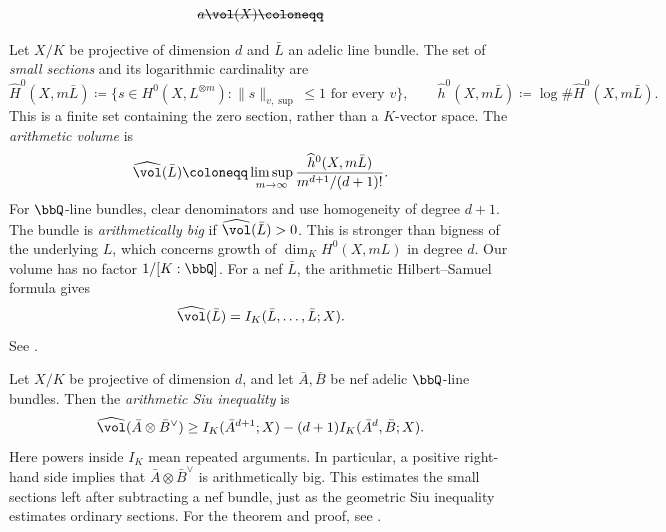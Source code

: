 \begin{definition}[label=\labelNFM{def:arithmetic-volume-of-adelic-line-bundle}, status=draft, tag=0000000]
	\[ \latexdeletedmath{a\vol(X) \coloneqq} \]
	\begin{latexmathchange}
	Let $X/K$ be projective of dimension $d$ and $\bar L$ an adelic line bundle.
	The set of \emph{small sections} and its logarithmic cardinality are
	\[ \widehat H^0(X,m\bar L) \coloneqq \{s \in H^0(X,L^{\otimes m}):\|s\|_{v,\sup} \leq 1\text{ for every }v\}, \qquad \widehat h^0(X,m\bar L) \coloneqq \log\#\widehat H^0(X,m\bar L). \]
	This is a finite set containing the zero section, rather than a $K$-vector space.
	The \emph{arithmetic volume} is
	\[ \widehat{\vol}(\bar L) \coloneqq \limsup_{m \to \infty}\frac{\widehat h^0(X,m\bar L)}{m^{d+1}/(d+1)!}. \]
	For $\bbQ$-line bundles, clear denominators and use homogeneity of degree $d+1$.
	The bundle is \emph{arithmetically big} if $\widehat{\vol}(\bar L) > 0$.
	This is stronger than bigness of the underlying $L$, which concerns growth of $\dim_K H^0(X,mL)$ in degree $d$.
	Our volume has no factor $1/[K:\bbQ]$.
	For a nef $\bar L$, the arithmetic Hilbert--Samuel formula gives
	\[ \widehat{\vol}(\bar L) = I_K(\bar L,\ldots,\bar L;X). \]
	See \cite[\S\S 5.1--5.2, especially Theorem~5.2.2]{Yuan-Zhang-2026-AdelicLineBundles}.
	\end{latexmathchange}
\end{definition}

\begin{theorem}[label=\labelNFM{thm:arithmetic-siu-inequality}, status=draft, tag=0000000]
	\Yang{}
	\begin{latexmathchange}
	Let $X/K$ be projective of dimension $d$, and let $\bar A,\bar B$ be nef adelic $\bbQ$-line bundles.
	Then the \emph{arithmetic Siu inequality} is
	\[ \widehat{\vol}(\bar A\otimes\bar B^\vee) \geq I_K(\bar A^{d+1};X)-(d+1)I_K(\bar A^d,\bar B;X). \]
	Here powers inside $I_K$ mean repeated arguments.
	In particular, a positive right-hand side implies that $\bar A\otimes\bar B^\vee$ is arithmetically big.
	This estimates the small sections left after subtracting a nef bundle, just as the geometric Siu inequality estimates ordinary sections.
	For the theorem and proof, see \cite[Theorem~5.2.2(2)]{Yuan-Zhang-2026-AdelicLineBundles}.
	\end{latexmathchange}
\end{theorem}


